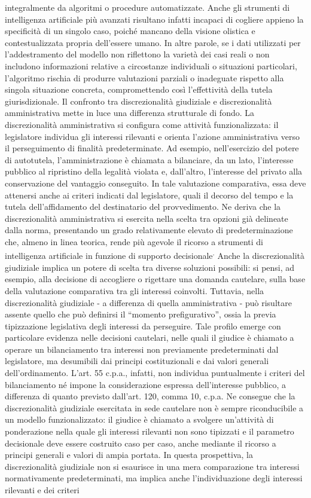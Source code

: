 \documentclass[american,a4paper,]{article}
\begin{document}
integralmente da algoritmi o procedure automatizzate. Anche gli strumenti di intelligenza artificiale più avanzati risultano infatti incapaci di cogliere appieno la specificità di un singolo caso, poiché mancano della visione olistica e contestualizzata propria dell'essere umano. In altre parole, se i dati utilizzati per l'addestramento del modello non riflettono la varietà dei casi reali o non includono informazioni relative a circostanze individuali o situazioni particolari, l'algoritmo rischia di produrre valutazioni parziali o inadeguate rispetto alla singola situazione concreta, compromettendo così l'effettività della tutela giurisdizionale. Il confronto tra discrezionalità giudiziale e discrezionalità amministrativa mette in luce una differenza strutturale di fondo. La discrezionalità amministrativa si configura come attività funzionalizzata: il legislatore individua gli interessi rilevanti e orienta l'azione amministrativa verso il perseguimento di finalità predeterminate. Ad esempio, nell'esercizio del potere di autotutela, l'amministrazione è chiamata a bilanciare, da un lato, l'interesse pubblico al ripristino della legalità violata e, dall'altro, l'interesse del privato alla conservazione del vantaggio conseguito. In tale valutazione comparativa, essa deve attenersi anche ai criteri indicati dal legislatore, quali il decorso del tempo e la tutela dell'affidamento del destinatario del provvedimento. Ne deriva che la discrezionalità amministrativa si esercita nella scelta tra opzioni già delineate dalla norma, presentando un grado relativamente elevato di predeterminazione che, almeno in linea teorica, rende più agevole il ricorso a strumenti di intelligenza artificiale in funzione di supporto decisionale\textsuperscript{.} Anche la discrezionalità giudiziale implica un potere di scelta tra diverse soluzioni possibili: si pensi, ad esempio, alla decisione di accogliere o rigettare una domanda cautelare, sulla base della valutazione comparativa tra gli interessi coinvolti. Tuttavia, nella discrezionalità giudiziale - a differenza di quella amministrativa - può risultare assente quello che può definirsi il ``momento prefigurativo'', ossia la previa tipizzazione legislativa degli interessi da perseguire. Tale profilo emerge con particolare evidenza nelle decisioni cautelari, nelle quali il giudice è chiamato a operare un bilanciamento tra interessi non previamente predeterminati dal legislatore, ma desumibili dai principi costituzionali e dai valori generali dell'ordinamento. L'art. 55 c.p.a., infatti, non individua puntualmente i criteri del bilanciamento né impone la considerazione espressa dell'interesse pubblico, a differenza di quanto previsto dall'art. 120, comma 10, c.p.a. Ne consegue che la discrezionalità giudiziale esercitata in sede cautelare non è sempre riconducibile a un modello funzionalizzato: il giudice è chiamato a svolgere un'attività di ponderazione nella quale gli interessi rilevanti non sono tipizzati e il parametro decisionale deve essere costruito caso per caso, anche mediante il ricorso a principi generali e valori di ampia portata. In questa prospettiva, la discrezionalità giudiziale non si esaurisce in una mera comparazione tra interessi normativamente predeterminati, ma implica anche l'individuazione degli interessi rilevanti e dei criteri 
\end{document}
